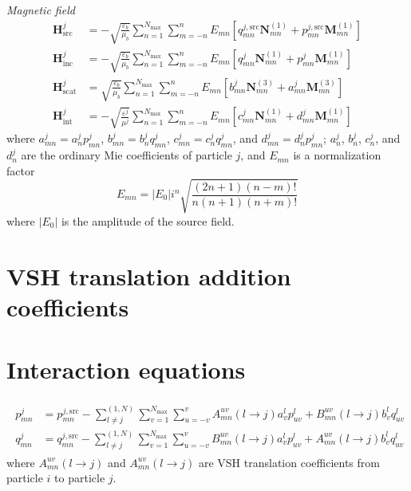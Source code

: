 \documentclass[11pt]{article}
\begin{document}
\textit{Magnetic field}
\begin{align}
    \boldsymbol{H}_\text{src}^j &= - \sqrt{\frac{\varepsilon_b}{\mu_b}} \sum_{n=1}^{N_\text{max}} \sum_{m=-n}^{n}
    E_{mn} \left[ q_{mn}^{j,\text{src}} \boldsymbol{N}_{mn}^{(1)} + p_{mn}^{j,\text{src}} \boldsymbol{M}_{mn}^{(1)} \right] \\
    \boldsymbol{H}_\text{inc}^j &= - \sqrt{\frac{\varepsilon_b}{\mu_b}} \sum_{n=1}^{N_\text{max}} \sum_{m=-n}^{n}
    E_{mn} \left[ q_{mn}^j \boldsymbol{N}_{mn}^{(1)} + p_{mn}^j \boldsymbol{M}_{mn}^{(1)} \right] \\
    \boldsymbol{H}_\text{scat}^j &= \sqrt{\frac{\varepsilon_b}{\mu_b}} \sum_{n=1}^{N_\text{max}} \sum_{m=-n}^{n}
    E_{mn} \left[b_{mn}^j \boldsymbol{N}_{mn}^{(3)} + a_{mn}^j \boldsymbol{M}_{mn}^{(3)} \right] \\
    \boldsymbol{H}_\text{int}^j &= -\sqrt{\frac{\varepsilon^j}{\mu^j}}  \sum_{n=1}^{N_\text{max}} \sum_{m=-n}^{n}
    E_{mn} \left[ c_{mn}^j \boldsymbol{N}_{mn}^{(1)} + d_{mn}^j \boldsymbol{M}_{mn}^{(1)} \right]
\end{align}
where $a_{mn}^j = a_n^j p_{mn}^j$, $b_{mn}^j = b_n^j q_{mn}^j$, $c_{mn}^j = c_n^j q_{mn}^j$, and $d_{mn}^j = d_n^j p_{mn}^j$; $a_n^j$, $b_n^j$, $c_n^j$, and $d_n^j$ are the ordinary Mie coefficients \cite{bohren2008absorption} of particle $j$, and $E_{mn}$ is a normalization factor
\begin{equation}
    E_{mn} = |E_0|i^n \sqrt{\frac{(2n+1)(n-m)!}{n(n+1)(n+m)!}}
\end{equation}
where $|E_0|$ is the amplitude of the source field.

\section{VSH translation addition coefficients}
\section{Interaction equations}
\begin{align}
    \begin{split}
        p_{mn}^j &= p_{mn}^{j,\text{src}}  -  \sum_{l \neq j}^{(1,N)}\sum_{v=1}^{N_\text{max}} \sum_{u=-v}^{v}
    A_{mn}^{uv}(l \rightarrow j) a_v^l p_{uv}^{l}
    +B_{mn}^{uv}(l \rightarrow j) b_v^l q_{uv}^{l} \\
    q_{mn}^j &= q_{mn}^{j,\text{src}}  -  \sum_{l \neq j}^{(1,N)}\sum_{v=1}^{N_\text{max}} \sum_{u=-v}^{v}
    B_{mn}^{uv}(l \rightarrow j) a_v^l p_{uv}^{l}
    +A_{mn}^{uv}(l \rightarrow j) b_v^l q_{uv}^{l}
    \label{eqn:gmt_system}
    \end{split}
\end{align}
where $A_{mn}^{uv}(l \rightarrow j)$ and $A_{mn}^{uv}(l \rightarrow j)$ are VSH translation coefficients from particle $i$ to particle $j$.
\end{document}
